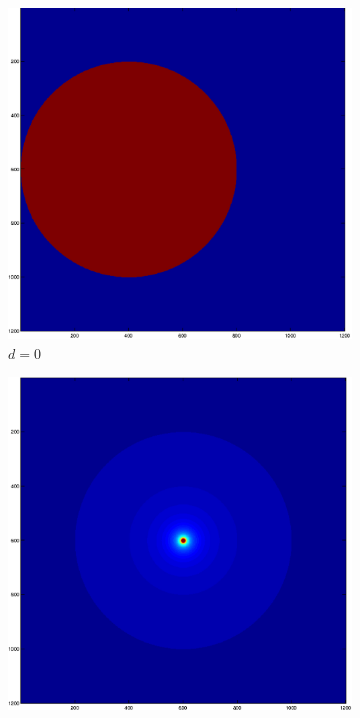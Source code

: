 \documentclass[a4wide, 10pt]{article}
\begin{document}
\begin{figure}[H]
        \centering
        \begin{subfigure}[b]{0.18\textwidth}
                \includegraphics[width=\textwidth]{EPSFiles/Mandelbrot_Power_0}
                \caption{$d = 0$}
        \end{subfigure}
        \begin{subfigure}[b]{0.18\textwidth}
                \includegraphics[width=\textwidth]{EPSFiles/Mandelbrot_Power_1}

\end{subfigure}
\end{figure}
\end{document}
